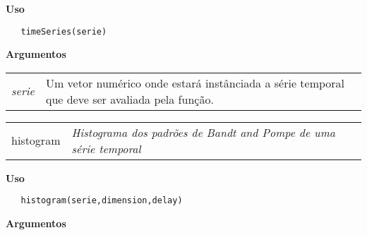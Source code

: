 \documentclass[12pt,letterpaper]{article}
\begin{document}
\hrulefill  

\vspace{0.5cm}

\textbf{Uso}

\begin{lstlisting}
   timeSeries(serie)
\end{lstlisting}

\vspace{0.5cm}

\textbf{Argumentos}

\begin{table}[!h]
\begin{center}
\begin{tabularx}{\textwidth}{X X}
\hspace{0.5cm} \textit{serie} & Um vetor numérico onde estará instânciada a série temporal que deve ser avaliada pela função.\\
\end{tabularx}
\end{center}
\end{table} 

\hrulefill   

\begin{table}[!h]
\begin{center}
\begin{tabularx}{\textwidth}{ X X}
\hspace{0.5cm} histogram & \textit{Histograma dos padrões de Bandt and Pompe de uma série temporal}\\
\end{tabularx}
\end{center}
\end{table} 

\vspace{-0.5cm}

\hrulefill  

\vspace{0.5cm}

\textbf{Uso}

\begin{lstlisting}
   histogram(serie,dimension,delay)
\end{lstlisting}

\vspace{0.5cm}

\textbf{Argumentos}
\end{document}
